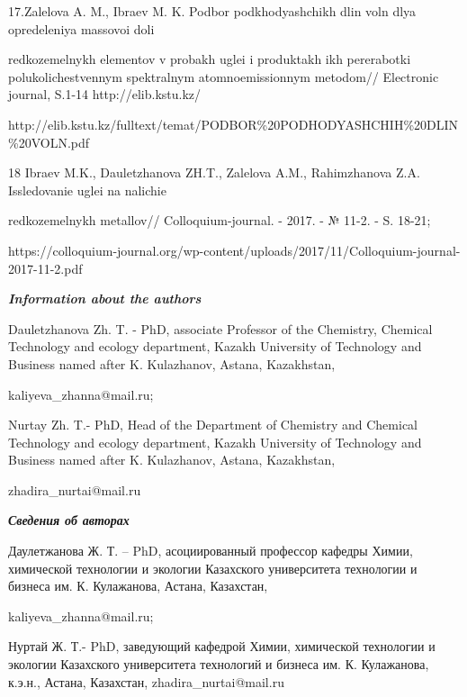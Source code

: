 \begin{noparindent}{2}
17.Zalelova A. M., Ibraev M. K. Podbor podkhodyashchikh dlin voln dlya
opredeleniya massovoi doli

redkozemel\textquotesingle nykh elementov v
probakh uglei i produktakh ikh pererabotki polukolichestvennym
spektral\textquotesingle nym atomnoemissionnym metodom// Electronic
journal, S.1-14 http://elib.kstu.kz/

http://elib.kstu.kz/fulltext/temat/PODBOR\%20PODHODYASHCHIH\%20DLIN\%20VOLN.pdf

18 Ibraev M.K., Dauletzhanova ZH.T., Zalelova A.M., Rahimzhanova Z.A.
Issledovanie uglei na nalichie

redkozemel\textquotesingle nykh
metallov// Colloquium-journal. - 2017. - № 11-2. - S. 18-21;

https://colloquium-journal.org/wp-content/uploads/2017/11/Colloquium-journal-2017-11-2.pdf
\end{noparindent}

\emph{{\bfseries Information about the authors}}

\begin{noparindent}
Dauletzhanova Zh. T. - PhD, associate Professor of the Chemistry,
Chemical Technology and ecology department, Kazakh University of
Technology and Business named after K. Kulazhanov, Astana, Kazakhstan,

kaliyeva\_zhanna@mail.ru;

Nurtay Zh. T.- PhD, Head of the Department of Chemistry and Chemical
Technology and ecology department, Kazakh University of Technology and
Business named after K. Kulazhanov, Astana, Kazakhstan,

zhadira\_nurtai@mail.ru
\end{noparindent}

\emph{{\bfseries Сведения об авторах}}

\begin{noparindent}
Даулетжанова Ж. Т. -- PhD, асоциированный профессор кафедры Химии,
химической технологии и экологии Казахского университета технологии и
бизнеса им. К. Кулажанова, Астана, Казахстан,

kaliyeva\_zhanna@mail.ru;

Нуртай Ж. Т.- PhD, заведующий кафедрой Химии, химической технологии и
экологии Казахского университета технологий и бизнеса им. К. Кулажанова,
к.э.н., Астана, Казахстан, zhadira\_nurtai@mail.ru
\end{noparindent}
